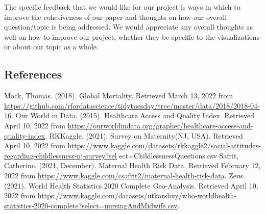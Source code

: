 \documentclass[
]{article}
\begin{document}
The specific feedback that we would like for our project is ways in
which to improve the cohesiveness of our paper and thoughts on how our
overall question/topic is being addressed. We would appreciate any
overall thoughts as well on how to improve our project, whether they be
specific to the visualizations or about our topic as a whole.

\hypertarget{references}{%
\subsection{References}\label{references}}

Mock, Thomas. (2018). Global Mortality. Retrieved March 13, 2022 from
\url{https://github.com/rfordatascience/tidytuesday/tree/master/data/2018/2018-04-16}.
\skip Our World in Data. (2015). Healthcare Access and Quality Index.
Retrieved April 10, 2022 from
\url{https://ourworldindata.org/grapher/healthcare-access-and-quality-index}.
\skip RKKaggle. (2021). Survey on Maternity(NJ, USA). Retrieved April
10, 2022 from
\url{https://www.kaggle.com/datasets/rkkaggle2/social-attitudes-regarding-childlessness-nj-survey?sel}
ect=ChildlessnessQuestions.csv \skip Safrit, Catherine. (2021,
December). Maternal Health Risk Data. Retrieved February 12, 2022 from
\url{https://www.kaggle.com/csafrit2/maternal-health-risk-data}. \skip
Zeus. (2021). World Health Statistics 2020 \textbar{} Complete
\textbar{} Geo-Analysis. Retrieved April 10, 2022 from
\url{https://www.kaggle.com/datasets/utkarshxy/who-worldhealth-statistics-2020-complete?select=nursingAndMidwife.csv}.
\end{document}
